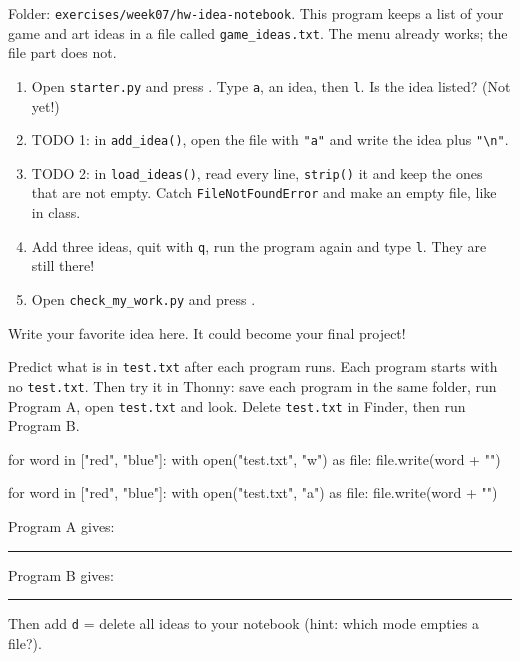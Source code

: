 \namedateline

\begin{core}
Folder: \texttt{exercises/week07/hw-idea-notebook}. This program keeps a list of your game and art ideas in a file called
\texttt{game\_ideas.txt}. The menu already works; the file part does not.
\begin{enumerate}[leftmargin=1.4em]
  \item Open \texttt{starter.py} and press . Type \texttt{a}, an idea, then \texttt{l}. Is the idea listed? (Not yet!)
  \item TODO 1: in \texttt{add\_idea()}, open the file with \texttt{"a"} and write the idea plus \texttt{"\textbackslash n"}.
  \item TODO 2: in \texttt{load\_ideas()}, read every line, \texttt{strip()} it and keep the ones that are not empty. Catch
        \texttt{FileNotFoundError} and make an empty file, like in class.
  \item Add three ideas, quit with \texttt{q}, run the program again and type \texttt{l}. They are still there!
  \item Open \texttt{check\_my\_work.py} and press .
\end{enumerate}
Write your favorite idea here. It could become your final project!
\end{core}

\begin{challenge}
Predict what is in \texttt{test.txt} after each program runs. Each program starts with no \texttt{test.txt}.
Then try it in Thonny: save each program in the same folder, run Program A, open \texttt{test.txt} and look.
Delete \texttt{test.txt} in Finder, then run Program B.
\begin{pycode}[Program A]
for word in ["red", "blue"]:
    with open("test.txt", "w") as file:
        file.write(word + "\n")
\end{pycode}
\begin{pycode}[Program B]
for word in ["red", "blue"]:
    with open("test.txt", "a") as file:
        file.write(word + "\n")
\end{pycode}
Program A gives: \rule{4cm}{0.4pt} \qquad Program B gives: \rule{4cm}{0.4pt}
\par Then add \texttt{d} = delete all ideas to your notebook (hint: which mode empties a file?).
\end{challenge}

